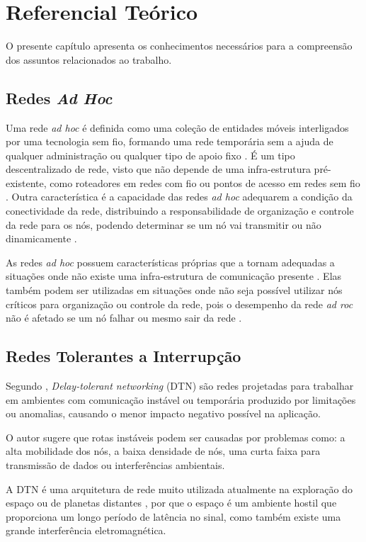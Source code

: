 \section{Referencial Teórico}
\label{sec:referencialTeorico}

O presente capítulo apresenta os conhecimentos necessários para a compreensão dos assuntos relacionados ao trabalho. 

\subsection{Redes \emph{Ad Hoc}}

Uma rede \emph{ad hoc} é definida como uma coleção de entidades móveis interligados por uma tecnologia sem fio, formando uma rede temporária sem a ajuda de qualquer administração ou qualquer tipo de apoio fixo \cite{Zafoune:2007}. É um tipo descentralizado de rede, visto que não depende de uma infra-estrutura pré-existente, como roteadores em redes com fio ou pontos de acesso em redes sem fio \cite{Niazi:2009}. Outra característica é a capacidade das redes \emph{ad hoc} adequarem a condição da conectividade da rede, distribuindo a responsabilidade de organização e controle da rede para os nós, podendo determinar se um nó vai transmitir ou não dinamicamente \cite{Rezende:2008}.

As redes \emph{ad hoc} possuem características próprias que a tornam adequadas a situações onde não existe uma infra-estrutura de comunicação presente \cite{Niculescu:2003}. Elas também podem ser utilizadas em situações onde não seja possível utilizar nós críticos para organização ou controle da rede, pois o desempenho da rede \emph{ad roc} não é afetado se um nó falhar ou mesmo sair da rede \cite{Dressler:2008}.

\subsection{Redes Tolerantes a Interrupção}
Segundo \cite{Nichols:2007}, \emph{Delay-tolerant networking} (DTN) são redes projetadas para trabalhar em ambientes com comunicação instável ou temporária produzido por limitações ou anomalias, causando o menor impacto negativo possível na aplicação. 

O autor \cite{Burgess:2006} sugere que rotas instáveis podem ser causadas por problemas como: a alta mobilidade dos nós, a baixa densidade de nós, uma curta faixa para transmissão de dados ou interferências ambientais.

A DTN é uma arquitetura de rede muito utilizada atualmente na exploração do espaço ou de planetas distantes \cite{Spyropoulos:2010}, por que o espaço é um ambiente hostil que proporciona um longo período de latência no sinal, como também existe uma grande interferência eletromagnética.

